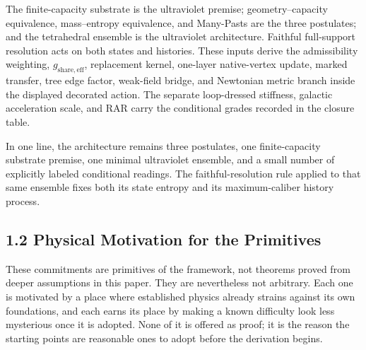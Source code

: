 \documentclass[11pt]{article}
\begin{document}
The finite-capacity substrate is the ultraviolet premise; geometry--capacity equivalence, mass--entropy equivalence, and Many-Pasts are the three postulates; and the tetrahedral ensemble is the ultraviolet architecture. Faithful full-support resolution acts on both states and histories. These inputs derive the admissibility weighting, $g_{\mathrm{share,eff}}$, replacement kernel, one-layer native-vertex update, marked transfer, tree edge factor, weak-field bridge, and Newtonian metric branch inside the displayed decorated action. The separate loop-dressed stiffness, galactic acceleration scale, and RAR carry the conditional grades recorded in the closure table.

In one line, the architecture remains three postulates, one finite-capacity substrate premise, one minimal ultraviolet ensemble, and a small number of explicitly labeled conditional readings. The faithful-resolution rule applied to that same ensemble fixes both its state entropy and its maximum-caliber history process.

\subsection{1.2 Physical Motivation for the Primitives}

These commitments are primitives of the framework, not theorems proved from deeper assumptions in this paper. They are nevertheless not arbitrary. Each one is motivated by a place where established physics already strains against its own foundations, and each earns its place by making a known difficulty look less mysterious once it is adopted. None of it is offered as proof; it is the reason the starting points are reasonable ones to adopt before the derivation begins.
\end{document}
